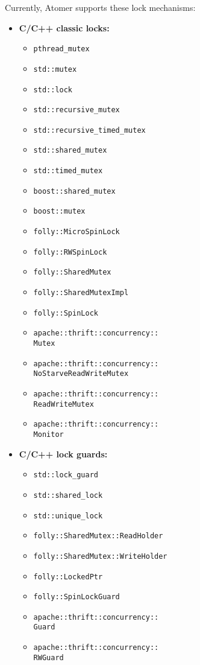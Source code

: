 Currently, Atomer supports these lock mechanisms:
\begin{itemize}
    \item
        \textbf{C/C++ classic locks:}
        \begin{itemize}
            \item \texttt{pthread\_mutex}
            \item \texttt{std::mutex}
            \item \texttt{std::lock}
            \item \texttt{std::recursive\_mutex}
            \item \texttt{std::recursive\_timed\_mutex}
            \item \texttt{std::shared\_mutex}
            \item \texttt{std::timed\_mutex}
            \item \texttt{boost::shared\_mutex}
            \item \texttt{boost::mutex}
            \item \texttt{folly::MicroSpinLock}
            \item \texttt{folly::RWSpinLock}
            \item \texttt{folly::SharedMutex}
            \item \texttt{folly::SharedMutexImpl}
            \item \texttt{folly::SpinLock}
            \item \texttt{apache::thrift::concurrency::\\Mutex}
            \item \texttt{apache::thrift::concurrency::\\%
                NoStarveReadWriteMutex}
            \item \texttt{apache::thrift::concurrency::\\ReadWriteMutex}
            \item \texttt{apache::thrift::concurrency::\\Monitor}
        \end{itemize}

    \item
        \textbf{C/C++ lock guards:}
        \begin{itemize}
            \item \texttt{std::lock\_guard}
            \item \texttt{std::shared\_lock}
            \item \texttt{std::unique\_lock}
            \item \texttt{folly::SharedMutex::ReadHolder}
            \item \texttt{folly::SharedMutex::WriteHolder}
            \item \texttt{folly::LockedPtr}
            \item \texttt{folly::SpinLockGuard}
            \item \texttt{apache::thrift::concurrency::\\Guard}
            \item \texttt{apache::thrift::concurrency::\\RWGuard}
        \end{itemize}


\end{itemize}
